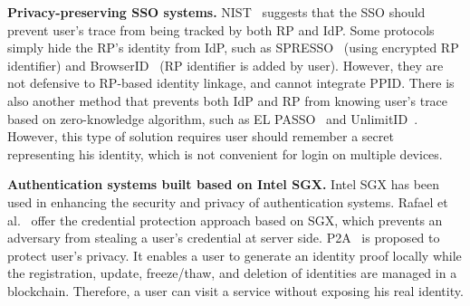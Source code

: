 \vspace{1mm}\noindent\textbf{Privacy-preserving SSO systems.} NIST~\cite{NIST2017draft} suggests that the SSO should prevent user's trace from being tracked by both RP and IdP.
Some protocols simply hide the RP's identity from IdP, such as SPRESSO~\cite{SPRESSO} (using encrypted RP identifier) and BrowserID~\cite{BrowserID} (RP identifier is added by user). However,  they are not defensive to RP-based identity linkage, and cannot integrate PPID.
There is also another method that prevents both IdP and RP from knowing user's trace based on zero-knowledge algorithm, such as EL PASSO~\cite{ZhangKSZR21} and UnlimitID~\cite{IsaakidisHD16}. However, this type of solution requires user should remember a secret representing his identity, which is not convenient for login on multiple devices.



\vspace{1mm}\noindent\textbf{Authentication systems built based on Intel SGX.} Intel SGX has been used in enhancing the security and privacy of authentication systems. Rafael et al.~\cite{CondeMW18} offer the credential protection approach based on SGX, which prevents an adversary from stealing a user's credential at server side. P2A~\cite{SongWLOWL20} is proposed to protect user's privacy. It enables a user to generate an identity proof locally while the registration, update, freeze/thaw, and deletion of identities are managed in a blockchain. Therefore, a user can visit a service without exposing his real identity.

